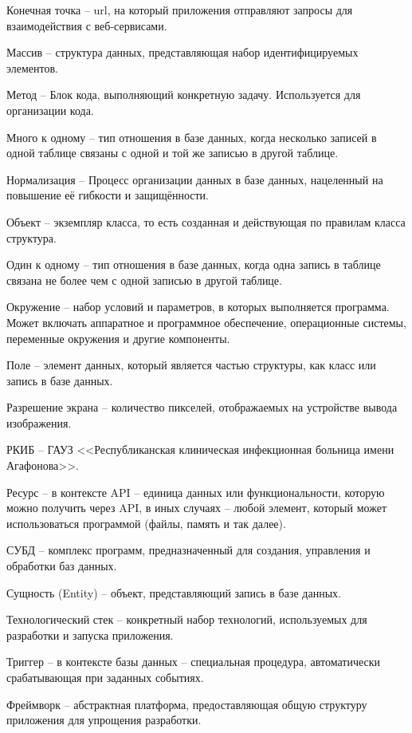 \documentclass[a4paper,article]{article}
\begin{document}
\begin{sloppypar}
    Конечная точка -- url, на который приложения отправляют запросы для взаимодействия с веб-сервисами.

    Массив -- структура данных, представляющая набор идентифицируемых элементов.

    Метод -- Блок кода, выполняющий конкретную задачу. Используется для организации кода.

    Много к одному -- тип отношения в базе данных, когда несколько записей в одной таблице связаны с одной и той же записью в другой таблице.

    Нормализация -- Процесс организации данных в базе данных, нацеленный на повышение её гибкости и защищённости.

    Объект -- экземпляр класса, то есть созданная и действующая по правилам класса структура.

    Один к одному -- тип отношения в базе данных, когда одна запись в таблице связана не более чем с одной записью в другой таблице.

    Окружение -- набор условий и параметров, в которых выполняется программа. Может включать аппаратное и программное обеспечение, операционные системы, переменные окружения и другие компоненты.

    Поле -- элемент данных, который является частью структуры, как класс или запись в базе данных.

    Разрешение экрана -- количество пикселей, отображаемых на устройстве вывода изображения.

    РКИБ -- ГАУЗ <<Республиканская клиническая инфекционная больница имени Агафонова>>.

    Ресурс -- в контексте API -- единица данных или функциональности, которую можно получить через API, в иных случаях -- любой элемент, который может использоваться программой (файлы, память и так далее).

    СУБД -- комплекс программ, предназначенный для создания, управления и обработки баз данных.

    Сущность (Entity) -- объект, представляющий запись в базе данных.

    Технологический стек -- конкретный набор технологий, используемых для разработки и запуска приложения.

    Триггер -- в контексте базы данных -- специальная процедура, автоматически срабатывающая при заданных событиях.

    Фреймворк -- абстрактная платформа, предоставляющая общую структуру приложения для упрощения разработки.


\end{sloppypar}
\end{document}
